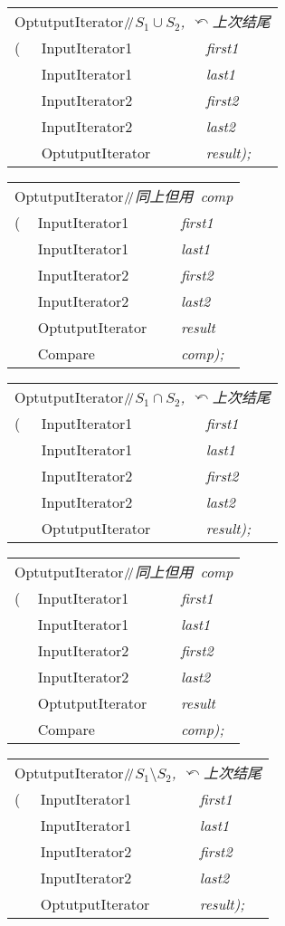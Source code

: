 \documentclass[c5size,landscape,twoside,a4paper]{ctexart}
\makeatletter
\newif\ifafour
\newif\ifletter
\let\ifafour\iftrue
\let\ifletter\iffalse
\newcommand{\<}{\ensuremath{\langle}}
\renewcommand{\>}{\ensuremath{\rangle}}
\newcommand{\Compare}{{{\bbfont C}\concfont ompare}}
\newcommand{\InputIterator}{{\bbfont I}{\concfont nputIterator}}
\newcommand{\OutputIterator}{{\bbfont O}{\hs}{\concfont utputIterator}}
\newcommand{\hs}[1][1]{\hskip #1pt}
\newcommand{\slsl}{\ensuremath{/\kern-.2em/}} %
\newcommand{\textComm}[1]{\textsl{\textsf{#1}}}
\newcommand{\Cppslsl}{\enskip\slsl\enskip}
\newcommand{\CppComm}[1]{\Cppslsl\textComm{#1}}
\newcommand{\ret}{\ensuremath{\curvearrowleft}}
\newcommand{\asbutusing}{同上但用}
\newcommand{\butcomp}{\asbutusing\ \textsl{comp}}
\newcommand{\commcr}{{\normalfont{,}} \\}
\newcommand{\doColorNamed}[2]{\color[named]{#1}{#2}}
\newcommand{\doColorNamed}[2]{#2}
\newcommand{\StrongClrBf}[1]{{\small\doColorNamed{Red}\textbf{#1}}}
\newenvironment{funcdec}
 { %
   \ifletter
     \setlength{\extrarowheight}{-2pt}
   \else
     \setlength{\extrarowheight}{-4pt}
   \fi
        \setlength{\tabcolsep}{0pt}
   \begin{tabular}{ll @{\quad}>{\slshape}l}}
 {\end{tabular}}
\newcommand{\lp}{(}
\newcommand{\rp}{)}
\newcommand{\parVal}[2]{{\slshape#1}{\textnormal#2}}
\newcommand{\lastPar}[1]{\parVal{#1}{\rp;}}
\makeatother
\begin{document}
\begin{multicols}{4}
\begin{funcdec}
\multicolumn{3}{l}{\OutputIterator \CppComm{\(S_1 \cup S_2\), \ret 上次结尾}}\\
\StrongClrBf{set_union}\lp& \InputIterator1   & first1\commcr
                          & \InputIterator1   & last1\commcr
                          & \InputIterator2   & first2\commcr
                          & \InputIterator2   & last2\commcr
                          & \OutputIterator   & \lastPar{result}
\end{funcdec}


\begin{funcdec}
\multicolumn{3}{l}{\OutputIterator \CppComm{\butcomp}}\\
\StrongClrBf{set_union}\lp& \InputIterator1   & first1\commcr
                          & \InputIterator1   & last1\commcr
                          & \InputIterator2   & first2\commcr
                          & \InputIterator2   & last2\commcr
                          & \OutputIterator   & result\commcr
                          & \Compare          & \lastPar{comp}
\end{funcdec}



\begin{funcdec}
\multicolumn{3}{l}{\OutputIterator \CppComm{\(S_1 \cap S_2\), \ret 上次结尾}}\\
\StrongClrBf{set_intersection}\lp& \InputIterator1   & first1\commcr
                                & \InputIterator1   & last1\commcr
                                & \InputIterator2   & first2\commcr
                                & \InputIterator2   & last2\commcr
                                & \OutputIterator   & \lastPar{result}
\end{funcdec}


\begin{funcdec}
\multicolumn{3}{l}{\OutputIterator \CppComm{\butcomp}}\\
\StrongClrBf{set_intersection}\lp& \InputIterator1   & first1\commcr
                                 & \InputIterator1   & last1\commcr
                                 & \InputIterator2   & first2\commcr
                                 & \InputIterator2   & last2\commcr
                                 & \OutputIterator   & result\commcr
                                 & \Compare          & \lastPar{comp}
\end{funcdec}


\begin{funcdec}
\multicolumn{3}{l}{\OutputIterator \CppComm{\(S_1 \setminus S_2\), \ret 上次结尾}}\\
\StrongClrBf{set_difference}\lp& \InputIterator1   & first1\commcr
                               & \InputIterator1   & last1\commcr
                               & \InputIterator2   & first2\commcr
                               & \InputIterator2   & last2\commcr
                               & \OutputIterator   & \lastPar{result}
\end{funcdec}



\end{multicols}
\end{document}
